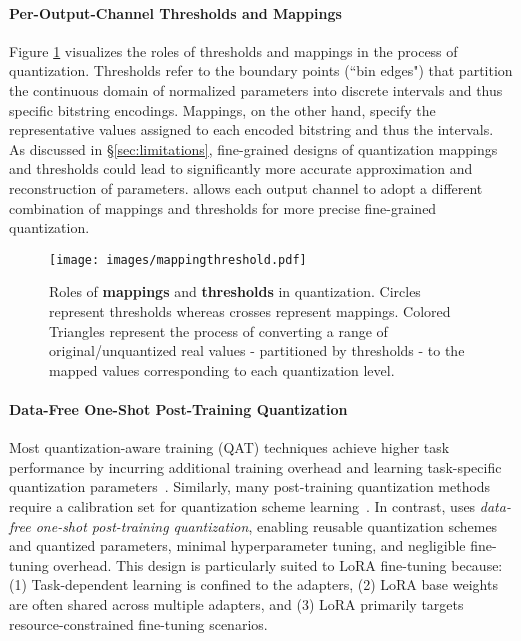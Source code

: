 \paragraph{Per-Output-Channel Thresholds and Mappings} 
Figure \ref{fig:mappingthreshold} visualizes the roles of thresholds and mappings in the process of quantization. Thresholds refer to the boundary points (``bin edges") that partition the continuous domain of normalized parameters into discrete intervals and thus specific bitstring encodings. 
Mappings, on the other hand, specify the representative values assigned to each encoded bitstring and thus the intervals. As discussed in \S\ref{sec:limitations}, fine-grained designs of quantization mappings and thresholds could lead to significantly more accurate approximation and reconstruction of parameters. 
\FWName{} allows each output channel to adopt a different combination of mappings and thresholds for more precise fine-grained quantization.

\begin{figure}[ht]
\begin{center}
\centerline{\texttt{[image: images/mappingthreshold.pdf]}}
\vspace{-10pt}
\caption{Roles of \textbf{mappings} and \textbf{thresholds} in quantization. Circles represent thresholds whereas crosses represent mappings. Colored Triangles represent the process of converting a range of original/unquantized real values - partitioned by thresholds - to the mapped values corresponding to each quantization level. 
}
\label{fig:mappingthreshold}
\end{center}
\vspace{-20pt}
\end{figure}


\paragraph{Data-Free One-Shot Post-Training Quantization}
Most quantization-aware training (QAT) techniques achieve higher task performance
by incurring additional training overhead and learning task-specific quantization 
parameters~\cite{esser2019learned,yang2021bsq,jeon2024l4q,savarese2022not}.
Similarly, many post-training quantization methods require a calibration set 
for quantization scheme learning~\cite{liao2024apiq,hubara2021accurate}.
In contrast, \FWName{} uses \emph{data-free one-shot post-training quantization}, 
enabling reusable quantization schemes and quantized parameters, minimal hyperparameter 
tuning, and negligible fine-tuning overhead.
This design is particularly suited to LoRA fine-tuning because: (1) Task-dependent learning is confined to the adapters, (2) LoRA base weights are often shared across multiple adapters, and (3) LoRA primarily targets resource-constrained fine-tuning scenarios. 

